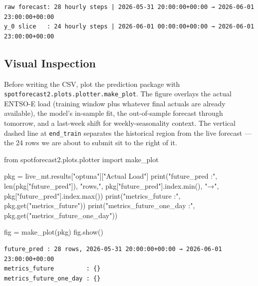 \documentclass[
  english,
  letterpaper,
]{scrbook}
\newenvironment{Shaded}{\begin{snugshade}}{\end{snugshade}}
\newcommand{\BuiltInTok}[1]{\textcolor[rgb]{0.00,0.23,0.31}{#1}}
\newcommand{\ImportTok}[1]{\textcolor[rgb]{0.00,0.46,0.62}{#1}}
\newcommand{\NormalTok}[1]{\textcolor[rgb]{0.00,0.23,0.31}{#1}}
\newcommand{\OperatorTok}[1]{\textcolor[rgb]{0.37,0.37,0.37}{#1}}
\newcommand{\StringTok}[1]{\textcolor[rgb]{0.13,0.47,0.30}{#1}}
\begin{document}
\begin{verbatim}
raw forecast: 28 hourly steps | 2026-05-31 20:00:00+00:00 → 2026-06-01 23:00:00+00:00
y_0 slice   : 24 hourly steps | 2026-06-01 00:00:00+00:00 → 2026-06-01 23:00:00+00:00
\end{verbatim}

\subsection{Visual Inspection}\label{visual-inspection}

Before writing the CSV, plot the prediction package with
\texttt{spotforecast2.plots.plotter.make\_plot}. The figure overlays the
actual ENTSO-E load (training window plus whatever final actuals are
already available), the model's in-sample fit, the out-of-sample
forecast through tomorrow, and a last-week shift for weekly-seasonality
context. The vertical dashed line at \texttt{end\_train} separates the
historical region from the live forecast --- the 24 rows we are about to
submit sit to the right of it.

\begin{Shaded}
\begin{Highlighting}[]
\ImportTok{from}\NormalTok{ spotforecast2.plots.plotter }\ImportTok{import}\NormalTok{ make\_plot}

\NormalTok{pkg }\OperatorTok{=}\NormalTok{ live\_mt.results[}\StringTok{"optuna"}\NormalTok{][}\StringTok{"Actual Load"}\NormalTok{]}
\BuiltInTok{print}\NormalTok{(}\StringTok{"future\_pred :"}\NormalTok{, }\BuiltInTok{len}\NormalTok{(pkg[}\StringTok{"future\_pred"}\NormalTok{]), }\StringTok{"rows,"}\NormalTok{,}
\NormalTok{      pkg[}\StringTok{"future\_pred"}\NormalTok{].index.}\BuiltInTok{min}\NormalTok{(), }\StringTok{"→"}\NormalTok{, pkg[}\StringTok{"future\_pred"}\NormalTok{].index.}\BuiltInTok{max}\NormalTok{())}
\BuiltInTok{print}\NormalTok{(}\StringTok{"metrics\_future         :"}\NormalTok{, pkg.get(}\StringTok{"metrics\_future"}\NormalTok{))}
\BuiltInTok{print}\NormalTok{(}\StringTok{"metrics\_future\_one\_day :"}\NormalTok{, pkg.get(}\StringTok{"metrics\_future\_one\_day"}\NormalTok{))}

\NormalTok{fig }\OperatorTok{=}\NormalTok{ make\_plot(pkg)}
\NormalTok{fig.show()}
\end{Highlighting}
\end{Shaded}

\begin{verbatim}
future_pred : 28 rows, 2026-05-31 20:00:00+00:00 → 2026-06-01 23:00:00+00:00
metrics_future         : {}
metrics_future_one_day : {}
\end{verbatim}
\end{document}
